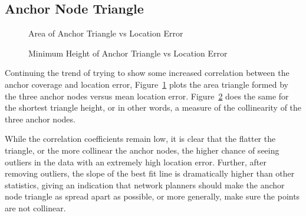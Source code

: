 \subsection{Anchor Node Triangle}

\begin{figure}
  \centering
	\caption{Area of Anchor Triangle vs Location Error}	    
	\label{fig:AnchorArea}
\end{figure}

\begin{figure}
  \centering
	\caption{Minimum Height of Anchor Triangle vs Location Error}	    
	\label{fig:AnchorHeight}
\end{figure}

Continuing the trend of trying to show some increased correlation between the anchor coverage and location error, Figure~\ref{fig:AnchorArea} plots the area triangle formed by the three anchor nodes versus mean location error. Figure~\ref{fig:AnchorHeight} does the same for the shortest triangle height, or in other words, a measure of the collinearity of the three anchor nodes.

While the correlation coefficients remain low, it is clear that the flatter the triangle, or the more collinear the anchor nodes, the higher chance of seeing outliers in the data with an extremely high location error. Further, after removing outliers, the slope of the best fit line is dramatically higher than other statistics, giving an indication that network planners should make the anchor node triangle as spread apart as possible, or more generally, make sure the points are not collinear.